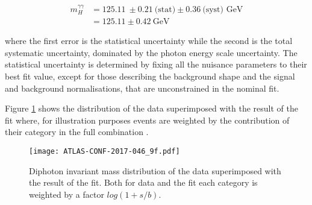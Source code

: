 \begin{align*}
  m_H^{\gamma\gamma} &= 125.11\ \pm 0.21\  \text{(stat)} \pm 0.36\ \text{(syst) GeV}\\
  &= 125.11\pm 0.42\ \text{GeV}
\end{align*}

where the first error is the statistical uncertainty while the second is the total systematic uncertainty, dominated by the photon energy scale uncertainty.
The statistical uncertainty is determined by fixing all the nuisance parameters to their best fit value, except for those describing the background shape and the signal and background normalisations, that are unconstrained in the nominal fit.

Figure \ref{fig:HGam_massDistrib} shows the distribution of the data superimposed with the result of the fit where, for illustration purposes events are weighted by the contribution of their category in the full combination \cite{ATLAS-CONF-2017-046}.

\begin{figure}[h!]
  \centering
  \texttt{[image: ATLAS-CONF-2017-046\_9f.pdf]}
  \caption{Diphoton invariant mass distribution of the data superimposed with the result of the fit.
    Both for data and the fit each category is weighted by a factor $log(1+s/b)$.
    \cite{ATLAS-CONF-2017-046}}
  \label{fig:HGam_massDistrib}
\end{figure}

